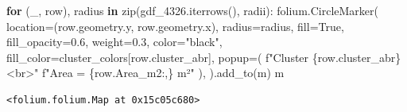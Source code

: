 \documentclass[
  letterpaper,
  DIV=11,
  numbers=noendperiod]{scrreprt}
\newenvironment{Shaded}{\begin{snugshade}}{\end{snugshade}}
\newcommand{\BuiltInTok}[1]{\textcolor[rgb]{0.00,0.23,0.31}{#1}}
\newcommand{\ControlFlowTok}[1]{\textcolor[rgb]{0.00,0.23,0.31}{\textbf{#1}}}
\newcommand{\FloatTok}[1]{\textcolor[rgb]{0.68,0.00,0.00}{#1}}
\newcommand{\KeywordTok}[1]{\textcolor[rgb]{0.00,0.23,0.31}{\textbf{#1}}}
\newcommand{\NormalTok}[1]{\textcolor[rgb]{0.00,0.23,0.31}{#1}}
\newcommand{\OperatorTok}[1]{\textcolor[rgb]{0.37,0.37,0.37}{#1}}
\newcommand{\SpecialCharTok}[1]{\textcolor[rgb]{0.37,0.37,0.37}{#1}}
\newcommand{\SpecialStringTok}[1]{\textcolor[rgb]{0.13,0.47,0.30}{#1}}
\newcommand{\StringTok}[1]{\textcolor[rgb]{0.13,0.47,0.30}{#1}}
\newcommand{\VariableTok}[1]{\textcolor[rgb]{0.07,0.07,0.07}{#1}}
\begin{document}
\begin{Shaded}
\begin{Highlighting}[]
\ControlFlowTok{for}\NormalTok{ (\_, row), radius }\KeywordTok{in} \BuiltInTok{zip}\NormalTok{(gdf\_4326.iterrows(), radii):}
\NormalTok{    folium.CircleMarker(}
\NormalTok{        location}\OperatorTok{=}\NormalTok{(row.geometry.y, row.geometry.x),}
\NormalTok{        radius}\OperatorTok{=}\NormalTok{radius,}
\NormalTok{        fill}\OperatorTok{=}\VariableTok{True}\NormalTok{,}
\NormalTok{        fill\_opacity}\OperatorTok{=}\FloatTok{0.6}\NormalTok{,}
\NormalTok{        weight}\OperatorTok{=}\FloatTok{0.3}\NormalTok{,}
\NormalTok{        color}\OperatorTok{=}\StringTok{"black"}\NormalTok{,}
\NormalTok{        fill\_color}\OperatorTok{=}\NormalTok{cluster\_colors[row.cluster\_abr],}
\NormalTok{        popup}\OperatorTok{=}\NormalTok{(}
            \SpecialStringTok{f"Cluster }\SpecialCharTok{\{}\NormalTok{row}\SpecialCharTok{.}\NormalTok{cluster\_abr}\SpecialCharTok{\}}\SpecialStringTok{\textless{}br\textgreater{}"}
            \SpecialStringTok{f"Area = }\SpecialCharTok{\{}\NormalTok{row}\SpecialCharTok{.}\NormalTok{Area\_m2}\SpecialCharTok{:,\}}\SpecialStringTok{ m²"}
\NormalTok{        ),}
\NormalTok{    ).add\_to(m)}
\NormalTok{m}
\end{Highlighting}
\end{Shaded}

\begin{verbatim}
<folium.folium.Map at 0x15c05c680>
\end{verbatim}
\end{document}
